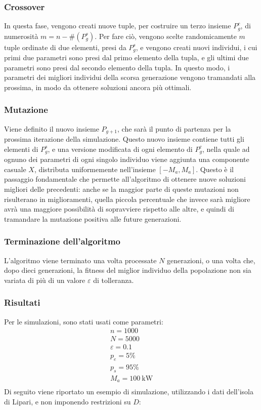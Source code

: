 \documentclass[fleqn,11pt]{SelfArx} %
\begin{document}
\subsubsection{Crossover}
In questa fase, vengono creati nuove tuple, per costruire un terzo insieme \(P^c_g\), di numerosità \(m = n - \#(P^s_g)\).
Per fare ciò, vengono scelte randomicamente \(m\) tuple ordinate di due elementi, presi da \(P^s_g\), e vengono creati nuovi individui, i cui primi due parametri sono presi dal primo elemento della tupla, e gli ultimi due parametri sono presi dal secondo elemento della tupla.
In questo modo, i parametri dei migliori individui della scorsa generazione vengono tramandati alla prossima, in modo da ottenere soluzioni ancora più ottimali.

\subsubsection{Mutazione}
Viene definito il nuovo insieme \(P_{g + 1}\), che sarà il punto di partenza per la prossima iterazione della simulazione.
Questo nuovo insieme contiene tutti gli elementi di \(P^s_g\), e una versione modificata di ogni elemento di \(P^c_g\), nella quale ad ognuno dei parametri di ogni singolo individuo viene aggiunta una componente casuale \(X\), distributa uniformemente nell'insieme \([-M_a, M_a]\).
Questo è il passaggio fondamentale che permette all'algoritmo di ottenere nuove soluzioni migliori delle precedenti: anche se la maggior parte di queste mutazioni non risulterano in miglioramenti, quella piccola percentuale che invece sarà migliore avrà una maggiore possibilità di sopravviere rispetto alle altre, e quindi di tramandare la mutazione positiva alle future generazioni.

\subsubsection{Terminazione dell'algoritmo}
L'algoritmo viene terminato una volta processate \(N\) generazioni, o una volta che, dopo dieci generazioni, la fitness del miglior individuo della popolazione non sia variata di più di un valore \(\varepsilon\) di tolleranza.

\subsubsection{Risultati}
Per le simulazioni, sono stati usati come parametri:
\begin{equation*}
	\begin{array}{ll}
		n = 1000            \\
		N = 5000            \\
		\varepsilon = 0.1   \\
		p_e = 5\%           \\
		p_s = 95\%          \\
		M_a = \SI{100}{\kW} \\
	\end{array}
\end{equation*}
Di seguito viene riportato un esempio di simulazione, utilizzando i dati dell'isola di Lipari, e non imponendo restrizioni su \(D\):
\end{document}
